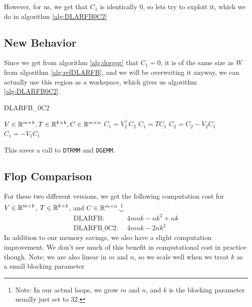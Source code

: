 \documentclass[12pt]{article}
\begin{document}
        However, for us, we get that $C_1$ is identically $0$, so lets try to exploit it, which we do in 
        algorithm \ref{alg:DLARFB0C2}
    \subsection{New Behavior}
    Since we get from algorithm \ref{alg:dorgqr} that $C_1 = 0$, it is of the same size as $W$ from 
    algorithm \ref{alg:refDLARFB}, and we will be overwriting it anyway, we can actually use this 
    region as a workspace, which gives us algorithm \ref{alg:DLARFB0C2}.
    \begin{algorithm}
        \caption{DLARFB\_0C2}\label{alg:DLARFB0C2}
        \begin{algorithmic}[1]
            \REQUIRE $V\in\mathbb{R}^{m\times k}, T\in\mathbb{R}^{k\times k}, C\in\mathbb{R}^{m\times n}$
            \STATE $C_1 = V_2^\top C_2$
            \STATE $C_1 = TC_1$
            \STATE $C_2 = C_2 - V_2C_1$
            \STATE $C_1 =     - V_1C_1$
        \end{algorithmic}
    \end{algorithm}
    This saves a call to \verb|DTRMM| and \verb|DGEMM|.
    \subsection{Flop Comparison}
        For these two different versions, we get the following computation cost for $V\in\mathbb{R}^{m\times k}$, $T\in\mathbb{R}^{k\times k}$, and $C\in\mathbb{R}^{m\times n}$.\footnote{Note: In our actual loops, we grow $m$ and $n$, and $k$ is the blocking parameter usually just set to $32$.}
        \begin{align*}
            \text{DLARFB: }&\, 4mnk - nk^2 + nk\\
            \text{DLARFB\_0C2: }&\, 4mnk - 2nk^2
        \end{align*}
        In addition to our memory savings, we also have a slight computation improvement. We don't see
        much of this benefit in computational cost in practice though. Note: we are also linear in $m$ and
        $n$, so we scale well when we treat $k$ as a small blocking parameter
\end{document}
